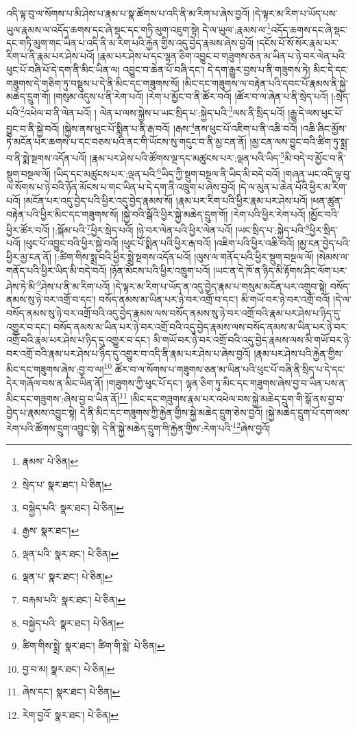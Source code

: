 འདི་ལྟ་བུ་ལ་སོགས་པ་མི་ཤེས་པ་རྣམ་པ་སྣ་ཚོགས་པ་འདི་ནི་མ་རིག་པ་ཞེས་བྱའོ། །དེ་ལྟར་མ་རིག་པ་ཡོད་པས་ཡུལ་རྣམས་ལ་འདོད་ཆགས་དང་ཞེ་སྡང་དང་གཏི་མུག་འཇུག་སྟེ། དེ་ལ་ཡུལ་:རྣམས་ལ་\footnote{རྣམས་  པེ་ཅིན། }འདོད་ཆགས་དང་ཞེ་སྡང་དང་གཏི་མུག་གང་ཡིན་པ་འདི་ནི་མ་རིག་པའི་རྐྱེན་གྱིས་འདུ་བྱེད་རྣམས་ཞེས་བྱའོ། །དངོས་པོ་སོ་སོར་རྣམ་པར་རིག་པ་ནི་རྣམ་པར་ཤེས་པའོ། །རྣམ་པར་ཤེས་པ་དང་ལྷན་ཅིག་འབྱུང་བ་གཟུགས་ཅན་མ་ཡིན་པ་ཉེ་བར་ལེན་པའི་ཕུང་པོ་བཞི་པོ་དེ་དག་ནི་མིང་ཡིན་ལ། འབྱུང་བ་ཆེན་པོ་བཞི་དང་། དེ་དག་རྒྱུར་བྱས་པ་ནི་གཟུགས་ཏེ། མིང་དེ་དང་གཟུགས་དེ་གཅིག་ཏུ་བསྡུས་པ་དེ་ནི་མིང་དང་གཟུགས་སོ། །མིང་དང་གཟུགས་ལ་བརྟེན་པའི་དབང་པོ་རྣམས་ནི་སྐྱེ་མཆེད་དྲུག་གོ། །གསུམ་འདུས་པ་ནི་རེག་པའོ། །རེག་པ་མྱོང་བ་ནི་ཚོར་བའོ། །ཚོར་བ་ལ་ཞེན་པ་ནི་སྲེད་པའོ། །:སྲེད་པའི་\footnote{སྲེད་པ་  སྣར་ཐང་།  པེ་ཅིན། }འཕེལ་བ་ནི་ལེན་པའོ། །
ལེན་པ་ལས་སྐྱེས་པ་ཡང་སྲིད་པ་:སྐྱེད་པའི་\footnote{བསྐྱེད་པའི་  སྣར་ཐང་།  པེ་ཅིན། }ལས་ནི་སྲིད་པའོ། །རྒྱུ་དེ་ལས་ཕུང་པོ་བྱུང་བ་ནི་སྐྱེ་བའོ། །སྐྱེས་ནས་ཕུང་པོ་སྨིན་པ་ནི་རྒ་བའོ། །རྒས་\footnote{རྒྱས་  སྣར་ཐང་། }ནས་ཕུང་པོ་འཇིག་པ་ནི་འཆི་བའོ། །འཆི་ཞིང་མྱོས་ཏེ་མངོན་པར་ཆགས་པ་དང་བཅས་པའི་ནང་གི་ཡོངས་སུ་གདུང་བ་ནི་མྱ་ངན་ནོ། །མྱ་ངན་ལས་བྱུང་བའི་ཚིག་ཏུ་སྨྲ་བ་ནི་སྨེ་སྔགས་འདོན་པའོ། །རྣམ་པར་ཤེས་པའི་ཚོགས་ལྔ་དང་མཚུངས་པར་:ལྡན་པའི་ཡིད་\footnote{ལྡན་པའི་  སྣར་ཐང་།  པེ་ཅིན། }མི་བདེ་བ་མྱོང་བ་ནི་སྡུག་བསྔལ་ལོ། །ཡིད་དང་མཚུངས་པར་:ལྡན་པའི་\footnote{ལྡན་པ་  སྣར་ཐང་།  པེ་ཅིན། }ཡིད་ཀྱི་སྡུག་བསྔལ་ནི་ཡིད་མི་བདེ་བའོ། །གཞན་ཡང་འདི་ལྟ་བུ་ལ་སོགས་པ་ཉེ་བའི་ཉོན་མོངས་པ་གང་ཡིན་པ་དེ་དག་ནི་འཁྲུག་པ་ཞེས་བྱའོ། །དེ་ལ་མུན་པ་ཆེན་པོའི་ཕྱིར་མ་རིག་པའོ། །མངོན་པར་འདུ་བྱེད་པའི་ཕྱིར་འདུ་བྱེད་རྣམས་སོ། །རྣམ་པར་རིག་པའི་ཕྱིར་རྣམ་པར་ཤེས་པའོ། །ཕན་ཚུན་བརྟེན་པའི་ཕྱིར་མིང་དང་གཟུགས་སོ། །སྐྱེ་བའི་སྒོའི་ཕྱིར་སྐྱེ་མཆེད་དྲུག་གོ། །རེག་པའི་ཕྱིར་རེག་པའོ། །མྱོང་བའི་ཕྱིར་ཚོར་བའོ། །:སྐོམ་པའི་\footnote{བརྐམ་པའི་  སྣར་ཐང་།  པེ་ཅིན། }ཕྱིར་སྲེད་པའོ། །ཉེ་བར་ལེན་པའི་ཕྱིར་ལེན་པའོ། །ཡང་སྲིད་པ་:སྐྱེད་པའི་\footnote{བསྐྱེད་པའི་  སྣར་ཐང་།  པེ་ཅིན། }ཕྱིར་སྲིད་པའོ། །ཕུང་པོ་འབྱུང་བའི་ཕྱིར་སྐྱེ་བའོ། །ཕུང་པོ་སྨིན་པའི་ཕྱིར་རྒ་བའོ། །འཇིག་པའི་ཕྱིར་འཆི་བའོ། །མྱ་ངན་བྱེད་པའི་ཕྱིར་མྱ་ངན་ནོ། །:ཚིག་གིས་སྨྲ་བའི་ཕྱིར་སྨྲེ་སྔགས་འདོན་པའོ། །ལུས་ལ་གནོད་པའི་ཕྱིར་སྡུག་བསྔལ་ལོ། །སེམས་ལ་གནོད་པའི་ཕྱིར་ཡིད་མི་བདེ་བའོ། །ཉོན་མོངས་པའི་ཕྱིར་འཁྲུག་པའོ། །ཡང་ན་དེ་ཁོ་ན་ཉིད་མི་རྟོགས་ཤིང་ལོག་པར་ཤེས་ཏེ་མི་\footnote{ཚིག་གིས་སྨྲེ་  སྣར་ཐང་། ཚིག་གི་སྨེ་  པེ་ཅིན། }ཤེས་པ་ནི་མ་རིག་པའོ། །དེ་ལྟར་མ་རིག་པ་ཡོད་ན་འདུ་བྱེད་རྣམ་པ་གསུམ་མངོན་པར་འགྲུབ་སྟེ། བསོད་ནམས་སུ་ཉེ་བར་འགྲོ་བ་དང་། བསོད་ནམས་མ་ཡིན་པར་ཉེ་བར་འགྲོ་བ་དང་། མི་གཡོ་བར་ཉེ་བར་འགྲོ་བའོ། །དེ་ལ་བསོད་ནམས་སུ་ཉེ་བར་འགྲོ་བའི་འདུ་བྱེད་རྣམས་ལས་བསོད་ནམས་སུ་ཉེ་བར་འགྲོ་བའི་རྣམ་པར་ཤེས་པ་ཉིད་དུ་འགྱུར་བ་དང་། བསོད་ནམས་མ་ཡིན་པར་ཉེ་བར་འགྲོ་བའི་འདུ་བྱེད་རྣམས་ལས་བསོད་ནམས་མ་ཡིན་པར་ཉེ་བར་འགྲོ་བའི་རྣམ་པར་ཤེས་པ་ཉིད་དུ་འགྱུར་བ་དང་། མི་གཡོ་བར་ཉེ་བར་འགྲོ་བའི་འདུ་བྱེད་རྣམས་ལས་མི་གཡོ་བར་ཉེ་བར་འགྲོ་བའི་རྣམ་པར་ཤེས་པ་ཉིད་དུ་འགྱུར་བ་འདི་ནི་རྣམ་པར་ཤེས་པ་ཞེས་བྱའོ། །རྣམ་པར་ཤེས་པའི་རྐྱེན་གྱིས་མིང་དང་གཟུགས་ཞེས་:བྱ་བ་ལ།\footnote{བྱ་བ་མ།  སྣར་ཐང་།  པེ་ཅིན། } ཚོར་བ་ལ་སོགས་པ་གཟུགས་ཅན་མ་ཡིན་པའི་ཕུང་པོ་བཞི་ནི་སྲིད་པ་དེ་དང་དེར་གཞོལ་བས་ན་མིང་ཡིན་ནོ། །གཟུགས་ཀྱི་ཕུང་པོ་དང་། ལྷན་ཅིག་ཏུ་མིང་དང་གཟུགས་ཞེས་བྱ་བ་ཡིན་པས་ན་མིང་དང་གཟུགས་:ཞེས་བྱ་བ་ཡིན་ནོ།\footnote{ཞེས་དང་།  སྣར་ཐང་།  པེ་ཅིན། } །མིང་དང་གཟུགས་རྣམ་པར་འཕེལ་བས་སྐྱེ་མཆེད་དྲུག་གི་སྒོ་ནས་བྱ་བ་བྱེད་པ་རྣམས་འབྱུང་སྟེ། དེ་ནི་མིང་དང་གཟུགས་ཀྱི་རྐྱེན་གྱིས་སྐྱེ་མཆེད་དྲུག་ཅེས་བྱའོ། །སྐྱེ་མཆེད་དྲུག་པོ་དག་ལས་རེག་པའི་ཚོགས་དྲུག་འབྱུང་སྟེ། དེ་ནི་སྐྱེ་མཆེད་དྲུག་གི་རྐྱེན་གྱིས་:རེག་པའི་\footnote{རེག་བྱའོ་  སྣར་ཐང་།  པེ་ཅིན། }ཞེས་བྱའོ། 